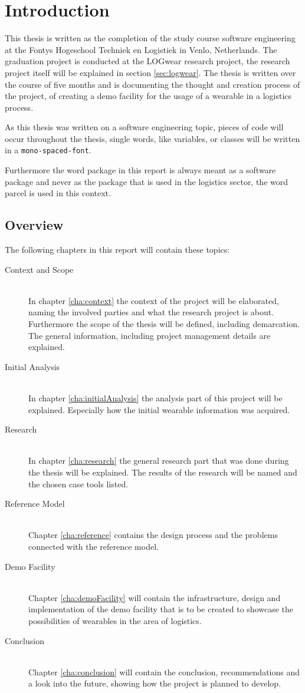 \chapter{Introduction}
This thesis is written as the completion of the study course software engineering at the Fontys Hogeschool Techniek en Logistiek in Venlo, Netherlands. The graduation project is conducted at the LOGwear research project, the research project itself will be explained in section \ref{sec:logwear}. The thesis is written over the course of five months and is documenting the thought and creation process of the project, of creating a demo facility for the usage of a wearable in a logistics process.

As this thesis was written on a software engineering topic, pieces of code will occur throughout the thesis, single words, like variables, or classes will be written in a \texttt{mono-spaced-font}. 

Furthermore the word \gls{package} in this report is always meant as a software package and never as the package that is used in the logistics sector, the word \gls{parcel} is used in this context.
\section*{Overview}
The following chapters in this report will contain these topics:

\begin{description}
	\item[Context and Scope] \hfill \\
	In chapter \ref{cha:context} the context of the project will be elaborated, naming the involved parties and what the research project is about. Furthermore the scope of the thesis will be defined, including demarcation. The general information, including project management details are explained.
	\item[Initial Analysis] \hfill \\
	In chapter \ref{cha:initialAnalysis} the analysis part of this project will be explained. Especially how the initial wearable information was acquired.
	\item[Research] \hfill \\
	In chapter \ref{cha:research} the general research part that was done during the thesis will be explained. The results of the research will be named and the chosen \gls{case} tools listed.
	\item[Reference Model] \hfill \\
	Chapter \ref{cha:reference} contains the design process and the problems connected with the reference model.
	\item[Demo Facility] \hfill \\
	Chapter \ref{cha:demoFacility} will contain the infrastructure, design and implementation of the demo facility that is to be created to showcase the possibilities of wearables in the area of logistics.
	\item[Conclusion] \hfill \\
	Chapter \ref{cha:conclusion} will contain the conclusion, recommendations and a look into the future, showing how the project is planned to develop.
\end{description}